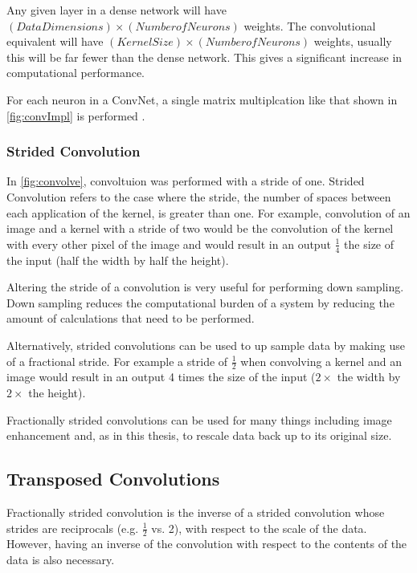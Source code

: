 Any given layer in a dense network will have $(Data Dimensions) \times (Number of Neurons)$ weights. The convolutional equivalent will have $(Kernel Size) \times (Number of Neurons)$ weights, usually this will be far fewer than the dense network. This gives a significant increase in computational performance.

For each neuron in a ConvNet, a single matrix multiplcation like that shown in \autoref{fig:convImpl} is performed .

\subsubsection{Strided Convolution}
In \autoref{fig:convolve}, convoltuion was performed with a stride of one. Strided Convolution refers to the case where the stride, the number of spaces between each application of the kernel, is greater than one. For example, convolution of an image and a kernel with a stride of two would be the convolution of the kernel with every other pixel of the image and would result in an output $\frac{1}{4}$ the size of the input (half the width by half the height).

Altering the stride of a convolution is very useful for performing down sampling. Down sampling reduces the computational burden of a system by reducing the amount of calculations that need to be performed.

Alternatively, strided convolutions can be used to up sample data by making use of a fractional stride. For example a stride of $\frac{1}{2}$ when convolving a kernel and an image would result in an output 4 times the size of the input ($2\times$ the width by $2\times$ the height).

Fractionally strided convolutions can be used for many things including image enhancement \cite{radford2015unsupervised} and, as in this thesis, to rescale data back up to its original size.

\subsection{Transposed Convolutions}
Fractionally strided convolution is the inverse of a strided convolution whose strides are reciprocals (e.g. $\frac{1}{2}$ vs. 2), with respect to the scale of the data. However, having an inverse of the convolution with respect to the contents of the data is also necessary.

